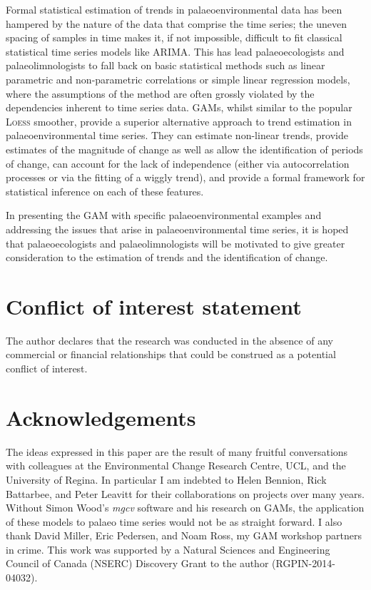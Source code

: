 \documentclass[12pt,]{article}
\newcommand{\loess}{\textsc{Loess}}
\begin{document}
Formal statistical estimation of trends in palaeoenvironmental data has
been hampered by the nature of the data that comprise the time series;
the uneven spacing of samples in time makes it, if not impossible,
difficult to fit classical statistical time series models like ARIMA.
This has lead palaeoecologists and palaeolimnologists to fall back on
basic statistical methods such as linear parametric and non-parametric
correlations or simple linear regression models, where the assumptions
of the method are often grossly violated by the dependencies inherent to
time series data. GAMs, whilst similar to the popular \loess{} smoother,
provide a superior alternative approach to trend estimation in
palaeoenvironmental time series. They can estimate non-linear trends,
provide estimates of the magnitude of change as well as allow the
identification of periods of change, can account for the lack of
independence (either via autocorrelation processes or via the fitting of
a wiggly trend), and provide a formal framework for statistical
inference on each of these features.

In presenting the GAM with specific palaeoenvironmental examples and
addressing the issues that arise in palaeoenvironmental time series, it
is hoped that palaeoecologists and palaeolimnologists will be motivated
to give greater consideration to the estimation of trends and the
identification of change.

\section*{Conflict of interest
statement}\label{conflict-of-interest-statement}

The author declares that the research was conducted in the absence of
any commercial or financial relationships that could be construed as a
potential conflict of interest.

\section*{Acknowledgements}\label{acknowledgements}

The ideas expressed in this paper are the result of many fruitful
conversations with colleagues at the Environmental Change Research
Centre, UCL, and the University of Regina. In particular I am indebted
to Helen Bennion, Rick Battarbee, and Peter Leavitt for their
collaborations on projects over many years. Without Simon Wood's
\emph{mgcv} software and his research on GAMs, the application of these
models to palaeo time series would not be as straight forward. I also
thank David Miller, Eric Pedersen, and Noam Ross, my GAM workshop
partners in crime. This work was supported by a Natural Sciences and
Engineering Council of Canada (NSERC) Discovery Grant to the author
(RGPIN-2014-04032).
\end{document}
